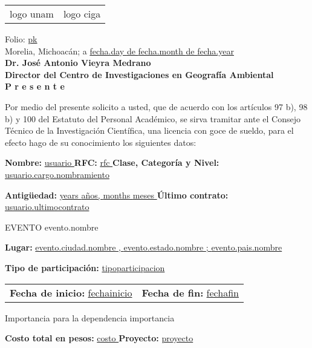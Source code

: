 \documentclass[12pt,letterpaper]{letter}
\begin{document}
\begin{tabular}{l r}
logo unam &
logo ciga 
\end{tabular} 


\hspace*{\fill} Folio: \underline{  {{ pk }}  } \\
\hspace*{\fill} Morelia, Michoacán; a \underline{  {{ fecha.day }} de {{ fecha.month }} de {{ fecha.year }} } \\

\textbf{Dr. José Antonio Vieyra Medrano} \\
\textbf{Director del Centro de Investigaciones en Geografía Ambiental} \\
\textbf{P r e s e n t e}

Por medio del presente solicito a usted, que de acuerdo con los artículos 97 b), 98 b) y 100 del Estatuto del Personal Académico, se sirva tramitar ante el Consejo Técnico de la Investigación Científica, una licencia con goce de sueldo, para el efecto hago de su conocimiento los siguientes datos:

\textbf{Nombre:} \underline{ {{ usuario }} } \textbf{ RFC:} \underline{ {{ rfc }} } \textbf{Clase, Categoría y Nivel:} \underline{ {{ usuario.cargo.nombramiento }} } 

\textbf{Antigüedad:} \underline{  {{ years }} años, {{ months }} meses } \textbf{Último contrato:} \underline{ {{ usuario.ultimocontrato }} } 

\begin{mybox}{EVENTO}
{{ evento.nombre }} 
\end{mybox}

\textbf{Lugar:} \underline{  {{ evento.ciudad.nombre }}, {{ evento.estado.nombre }}; {{ evento.pais.nombre }}  }

\textbf{Tipo de participación:} \underline{ {{ tipoparticipacion }} }

\begin{center}
\begin{tabular}{ l  r }
\textbf{Fecha de inicio:} \underline{  {{ fechainicio }}  } &
\textbf{Fecha de fin:} \underline{  {{ fechafin }}  }
\end{tabular}
\end{center}

\begin{mybox}{Importancia para la dependencia}
{{ importancia }} 
\end{mybox}

\textbf{Costo total en pesos:} \underline{ {{ costo }} }  \textbf{Proyecto:} \underline{ {{ proyecto }} }
\end{document}
